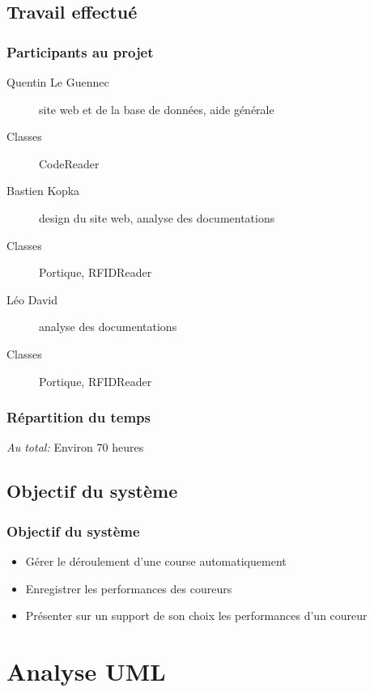 \documentclass[10pt,handout,usepdftitle=false,envcountsect]{beamer}
\begin{document}
\subsection{Travail effectué}
\begin{frame}

\frametitle{Participants au projet}
    \begin{description}
        \item[Quentin Le Guennec] site web et de la base de données, aide générale
            \item[Classes]{CodeReader}
            \newline
        \item[Bastien Kopka] design du site web, analyse des documentations
            \item[Classes]{Portique, RFIDReader}
            \newline
        \item[Léo David] analyse des documentations
            \item[Classes]{Portique, RFIDReader}
            \newline
    \end{description}
\end{frame}

\begin{frame}
\frametitle{Répartition du temps}
\emph{Au total:} Environ 70 heures
\end{frame}

\subsection{Objectif du système}
\begin{frame}
\frametitle{Objectif du système}
\begin{itemize}
    \item Gérer le déroulement d'une course automatiquement
    \item Enregistrer les performances des coureurs
    \item Présenter sur un support de son choix les performances d'un coureur
\end{itemize}
\end{frame}
\section{Analyse UML}
\end{document}
